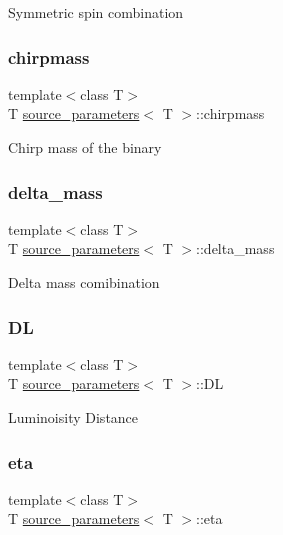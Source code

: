 Symmetric spin combination \mbox{\label{structsource__parameters_a45ed5fee56015020945397cad4090c0b}} 
\subsubsection{\texorpdfstring{chirpmass}{chirpmass}}
{\footnotesize\ttfamily template$<$class T$>$ \\
T \hyperlink{structsource__parameters}{source\+\_\+parameters}$<$ T $>$\+::chirpmass}

Chirp mass of the binary \mbox{\label{structsource__parameters_a6485c9fc5622ab2cd81170ceef81db66}} 
\subsubsection{\texorpdfstring{delta\+\_\+mass}{delta\_mass}}
{\footnotesize\ttfamily template$<$class T$>$ \\
T \hyperlink{structsource__parameters}{source\+\_\+parameters}$<$ T $>$\+::delta\+\_\+mass}

Delta mass comibination \mbox{\label{structsource__parameters_a3b63b38f49f875e1d9cc150c5753aa3c}} 
\subsubsection{\texorpdfstring{DL}{DL}}
{\footnotesize\ttfamily template$<$class T$>$ \\
T \hyperlink{structsource__parameters}{source\+\_\+parameters}$<$ T $>$\+::DL}

Luminoisity Distance \mbox{\label{structsource__parameters_ad0c3de98a95860855de219af0e095e81}} 
\subsubsection{\texorpdfstring{eta}{eta}}
{\footnotesize\ttfamily template$<$class T$>$ \\
T \hyperlink{structsource__parameters}{source\+\_\+parameters}$<$ T $>$\+::eta}


